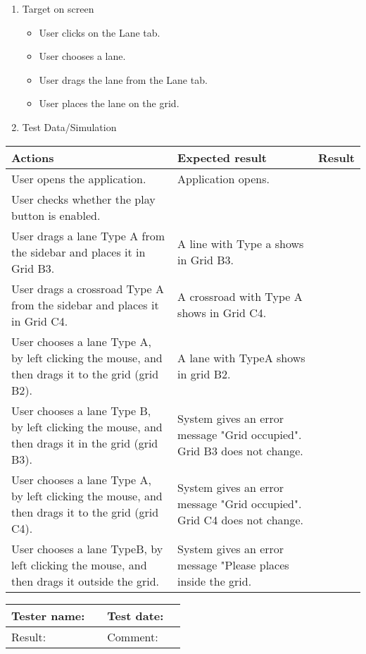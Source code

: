 \begin{enumerate}
	\item Target on screen
	\begin{itemize}
		\item User clicks on the Lane tab.
		\item User chooses a lane.
		\item User drags the lane from the Lane tab.
		\item User places the lane on the grid.
	\end{itemize}
	\item Test Data/Simulation
\end{enumerate}	
	\begin{tabularx}{\textwidth}{|X|X|p{2.5cm}|}\hline
		Actions & Expected result & Result \\\hline
		User opens the application.& Application opens. &  \pass \\\hline
		User checks whether the play button is enabled. & &  \pass \\\hline
		User drags a lane Type A from the sidebar and places it in Grid B3. & A line with Type a shows in Grid B3. & \pass \\\hline
		User drags a crossroad Type A from the sidebar and places it in Grid C4. & A crossroad with Type A shows in Grid C4. & \pass \\\hline
		User chooses a lane Type A, by left clicking the mouse, and then drags it to the grid (grid B2). & A lane with TypeA shows in grid B2. & \pass \\\hline
		User chooses a lane Type B, by left clicking the mouse, and then drags it in the grid (grid B3). & System gives an  error message "Grid occupied". Grid B3 does not change. & \pass\\\hline
		User chooses a lane Type A, by left clicking the mouse, and then drags it to the grid (grid C4). & System gives an  error message "Grid occupied". Grid C4 does not change. & \pass\\\hline
		User chooses a lane TypeB, by left clicking the mouse, and then drags it outside the grid. & System gives an error message "Please places inside the grid. & \pass\\\hline
	\end{tabularx}


\begin{tabularx}{\textwidth}{|p{3cm}X|p{3cm}X|}\hline
	Tester name: &  & Test date: & \\\hline
	Result: &  \pass  & Comment: & \\\hline
\end{tabularx}

